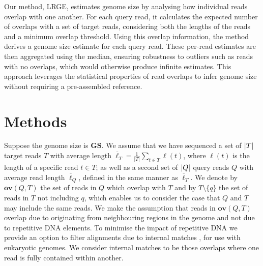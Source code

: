 \documentclass[unnumsec,webpdf,modern,large]{oup-authoring-template}
\theoremstyle{thmstyleone}%
\theoremstyle{thmstyletwo}%
\theoremstyle{thmstylethree}%
\newcommand{\overl}[2]{\mathbf{ov}(#1, #2)}
\DeclarePairedDelimiter\size{\lvert}{\rvert}
\newcommand{\gs}{\textbf{GS}}
\newcommand{\lrge}{LRGE}
\begin{document}
Our method, \lrge{}, estimates genome size by analysing how individual reads overlap with one another. For each query read, it calculates the expected number of overlaps with a set of target reads, considering both the lengths of the reads and a minimum overlap threshold. Using this overlap information, the method derives a genome size estimate for each query read. These per-read estimates are then aggregated using the median, ensuring robustness to outliers such as reads with no overlaps, which would otherwise produce infinite estimates. This approach leverages the statistical properties of read overlaps to infer genome size without requiring a pre-assembled reference.


\section{Methods}

Suppose the genome size is $\gs$. We assume that we have sequenced a set of $\size{T}$ target reads $T$ with average length $\overline{\ell}_T = \frac{1}{|T|} \sum_{t \in T} \ell(t)$, where $\ell(t)$ is the length of a specific read $t \in T$; as well as a second set of $\size{Q}$ query reads $Q$ with average read length $\overline{\ell}_Q$, defined in the same manner as $\overline{\ell}_T$.  We denote by $\overl{Q}{T}$ the set of reads in $Q$ which overlap with $T$ and by $T \setminus \{q\}$ the set of reads in $T$ not including $q$, which enables us to consider the case that $Q$ and $T$ may include the same reads.  We make the assumption that reads in $\overl{Q}{T}$  overlap due to originating from neighbouring regions in the genome and not due to repetitive DNA elements. To minimise the impact of repetitive DNA we provide an option to filter alignments due to internal matches \citep{li2016minimap}, for use with eukaryotic genomes. We consider internal matches to be those overlaps where one read is fully contained within another.
\end{document}
